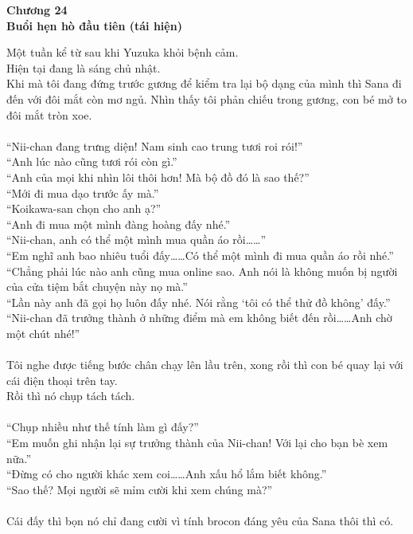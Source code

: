 \documentclass[12pt,a4paper, twosides]{book}
\begin{document}
    \begin{center}
    \textbf{\large Chương 24 \\ Buổi hẹn hò đầu tiên (tái hiện)}
    \end{center}
    \noindent
Một tuần kể từ sau khi Yuzuka khỏi bệnh cảm.\\
Hiện tại đang là sáng chủ nhật.\\
Khi mà tôi đang đứng trước gương để kiểm tra lại bộ dạng của mình thì Sana đi đến với đôi mắt còn mơ ngủ. Nhìn thấy tôi phản chiếu trong gương, con bé mở to đôi mắt tròn xoe.\\
\\
“Nii-chan đang trưng diện! Nam sinh cao trung tươi roi rói!”\\
“Anh lúc nào cũng tươi rói còn gì.”\\
“Anh của mọi khi nhìn lôi thôi hơn! Mà bộ đồ đó là sao thế?”\\
“Mới đi mua dạo trước ấy mà.”\\
“Koikawa-san chọn cho anh ạ?”\\
“Anh đi mua một mình đàng hoàng đấy nhé.”\\
“Nii-chan, anh có thể một mình mua quần áo rồi……”\\
“Em nghĩ anh bao nhiêu tuổi đấy……Có thể một mình đi mua quần áo rồi nhé.”\\
“Chẳng phải lúc nào anh cũng mua online sao. Anh nói là không muốn bị người của cửa tiệm bắt chuyện này nọ mà.”\\
“Lần này anh đã gọi họ luôn đấy nhé. Nói rằng ‘tôi có thể thử đồ không’ đấy.”\\
“Nii-chan đã trưởng thành ở những điểm mà em không biết đến rồi……Anh chờ một chút nhé!”\\
\\
Tôi nghe được tiếng bước chân chạy lên lầu trên, xong rồi thì con bé quay lại với cái điện thoại trên tay.\\
Rồi thì nó chụp tách tách.\\
\\
“Chụp nhiều như thế tính làm gì đấy?”\\
“Em muốn ghi nhận lại sự trưởng thành của Nii-chan! Với lại cho bạn bè xem nữa.”\\
“Đừng có cho người khác xem coi……Anh xấu hổ lắm biết không.”\\
“Sao thế? Mọi người sẽ mỉm cười khi xem chúng mà?”\\
\\
Cái đấy thì bọn nó chỉ đang cười vì tính brocon đáng yêu của Sana thôi thì có.\\
\end{document}
